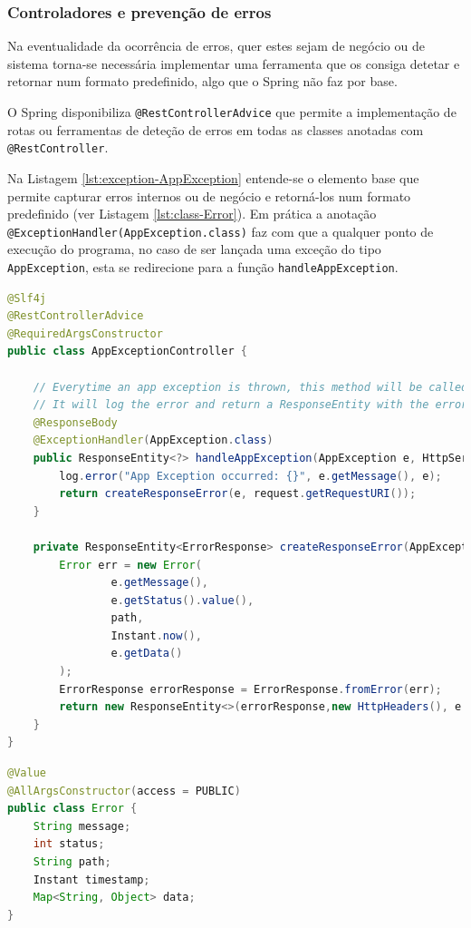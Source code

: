 \subsubsection{Controladores e prevenção de erros}

Na eventualidade da ocorrência de erros, quer estes sejam de negócio ou de sistema torna-se necessária implementar uma ferramenta que os consiga detetar e retornar num formato predefinido, algo que o \gls{Spring} não faz por base. 

O \gls{Spring} disponibiliza \lstinline|@RestControllerAdvice| que permite a implementação de rotas ou ferramentas de deteção de erros em todas as classes anotadas com \lstinline|@RestController|.

Na Listagem \ref{lst:exception-AppException} entende-se o elemento base que permite capturar erros internos ou de negócio e retorná-los num formato predefinido (ver Listagem \ref{lst:class-Error}). Em prática a anotação \lstinline|@ExceptionHandler(AppException.class)| faz com que a qualquer ponto de execução do programa, no caso de ser lançada uma exceção do tipo \lstinline|AppException|, esta se redirecione para a função \lstinline|handleAppException|. 

\begin{lstlisting}[language=Java, caption={Class \textit{AppExceptionController}}, label=lst:exception-AppException]
@Slf4j
@RestControllerAdvice
@RequiredArgsConstructor
public class AppExceptionController {

    // Everytime an app exception is thrown, this method will be called
    // It will log the error and return a ResponseEntity with the error details
    @ResponseBody
    @ExceptionHandler(AppException.class)
    public ResponseEntity<?> handleAppException(AppException e, HttpServletRequest request) {
        log.error("App Exception occurred: {}", e.getMessage(), e);
        return createResponseError(e, request.getRequestURI());
    }

    private ResponseEntity<ErrorResponse> createResponseError(AppException e, String path) {
        Error err = new Error(
                e.getMessage(),
                e.getStatus().value(),
                path,
                Instant.now(),
                e.getData()
        );
        ErrorResponse errorResponse = ErrorResponse.fromError(err);
        return new ResponseEntity<>(errorResponse,new HttpHeaders(), e.getStatus());
    }
}
\end{lstlisting}

\begin{lstlisting}[language=Java, caption={Class \textit{Error}}, label={lst:class-Error}]
@Value
@AllArgsConstructor(access = PUBLIC)
public class Error {
    String message;
    int status;
    String path;
    Instant timestamp;
    Map<String, Object> data;
}
\end{lstlisting}

